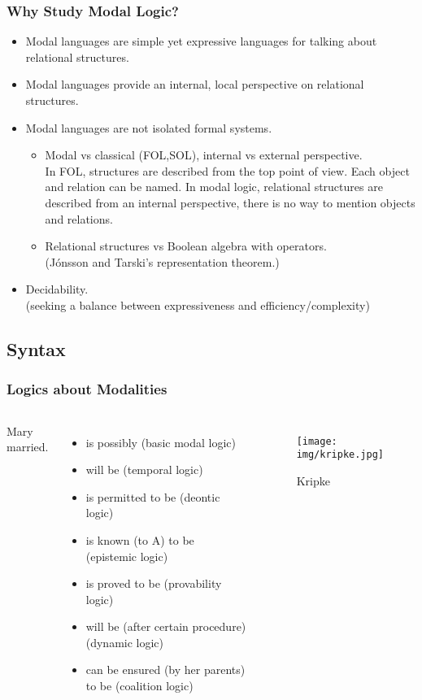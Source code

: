 \documentclass[UTF8,aspectratio=43,11pt,colorlinks,compress,openany]{beamer}%
\begin{document}
\begin{frame}\frametitle{Why Study Modal Logic?}
	\begin{itemize}
		\item Modal languages are simple yet expressive languages for talking about relational structures.
		\item Modal languages provide an internal, local perspective on relational structures.
		\item Modal languages are not isolated formal systems.
		\begin{itemize}
			\item Modal vs classical (FOL,SOL), internal vs external perspective.\\
			In FOL, structures are described from the top point of view. Each object and relation can be named. In modal logic, relational structures are described from an internal perspective, there is no way to mention objects and relations.
			\item Relational structures vs Boolean algebra with operators.\\
			(J\'onsson and Tarski's representation theorem.)
		\end{itemize}
		\item Decidability.\\
		(seeking a balance between expressiveness and efficiency/complexity)
	\end{itemize}
\end{frame}

\subsection{Syntax}

\begin{frame}\frametitle{Logics about Modalities}
\begin{columns}
Mary \underline{\phantom{xxxxx}} married.
\begin{itemize}
	\item is possibly (basic modal logic)
	\item will be (temporal logic)
	\item is permitted to be (deontic logic)
	\item is known (to A) to be (epistemic logic)
	\item is proved to be (provability logic)
	\item will be (after certain procedure) (dynamic logic)
	\item can be ensured (by her parents) to be (coalition logic)
\end{itemize}
\begin{figure}[H]
\texttt{[image: img/kripke.jpg]}\caption{Kripke}
\end{figure}
\end{columns}
\end{frame}
\end{document}
